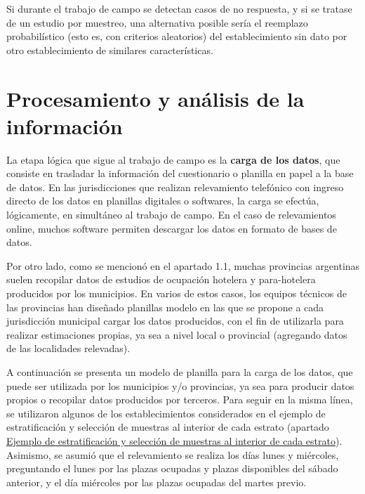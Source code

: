 \documentclass[
]{book}
\begin{document}
Si durante el trabajo de campo se detectan casos de no respuesta, y si se tratase de un estudio por muestreo, una alternativa posible sería el reemplazo probabilístico (esto es, con criterios aleatorios) del establecimiento sin dato por otro establecimiento de similares características.

\hypertarget{procesamiento-y-anuxe1lisis-de-la-informaciuxf3n}{%
\section{Procesamiento y análisis de la información}\label{procesamiento-y-anuxe1lisis-de-la-informaciuxf3n}}

La etapa lógica que sigue al trabajo de campo es la \textbf{carga de los datos}, que consiste en trasladar la información del cuestionario o planilla en papel a la base de datos. En las jurisdicciones que realizan relevamiento telefónico con ingreso directo de los datos en planillas digitales o softwares, la carga se efectúa, lógicamente, en simultáneo al trabajo de campo. En el caso de relevamientos online, muchos software permiten descargar los datos en formato de bases de datos.

Por otro lado, como se mencionó en el apartado 1.1, muchas provincias argentinas suelen recopilar datos de estudios de ocupación hotelera y para-hotelera producidos por los municipios. En varios de estos casos, los equipos técnicos de las provincias han diseñado planillas modelo en las que se propone a cada jurisdicción municipal cargar los datos producidos, con el fin de utilizarla para realizar estimaciones propias, ya sea a nivel local o provincial (agregando datos de las localidades relevadas).

A continuación se presenta un modelo de planilla para la carga de los datos, que puede ser utilizada por los municipios y/o provincias, ya sea para producir datos propios o recopilar datos producidos por terceros. Para seguir en la misma línea, se utilizaron algunos de los establecimientos considerados en el ejemplo de estratificación y selección de muestras al interior de cada estrato (apartado \protect\hyperlink{ejemplo-de-estratificaciuxf3n-y-selecciuxf3n-de-muestras-al-interior-de-cada-estrato}{Ejemplo de estratificación y selección de muestras al interior de cada estrato}). Asimismo, se asumió que el relevamiento se realiza los días lunes y miércoles, preguntando el lunes por las plazas ocupadas y plazas disponibles del sábado anterior, y el día miércoles por las plazas ocupadas del martes previo.
\end{document}
